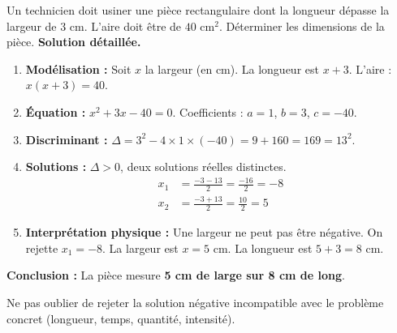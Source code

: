 \documentclass[11pt]{article}
\begin{document}
\begin{exoresolu}
    Un technicien doit usiner une pièce rectangulaire dont la longueur dépasse la largeur de $3$ cm. L'aire doit être de $40$ cm$^2$. Déterminer les dimensions de la pièce.
    \tcblower
    \textbf{Solution détaillée.}
    \begin{enumerate}
        \item \textbf{Modélisation :} Soit $x$ la largeur (en cm). La longueur est $x+3$. L'aire : $x(x+3) = 40$.
        \item \textbf{Équation :} $x^2 + 3x - 40 = 0$. Coefficients : $a=1$, $b=3$, $c=-40$.
        \item \textbf{Discriminant :} $\Delta = 3^2 - 4\times1\times(-40) = 9 + 160 = 169 = 13^2$.
        \item \textbf{Solutions :} $\Delta > 0$, deux solutions réelles distinctes.
        \begin{align*}
            x_1 &= \frac{-3 - 13}{2} = \frac{-16}{2} = -8 \\
            x_2 &= \frac{-3 + 13}{2} = \frac{10}{2} = 5
        \end{align*}
        \item \textbf{Interprétation physique :} Une largeur ne peut pas être négative. On rejette $x_1 = -8$.
        La largeur est $x = 5$ cm. La longueur est $5+3 = 8$ cm.
    \end{enumerate}
    \textbf{Conclusion :} La pièce mesure \textbf{5 cm de large sur 8 cm de long}.
    \begin{attention} Ne pas oublier de rejeter la solution négative incompatible avec le problème concret (longueur, temps, quantité, intensité).\end{attention}
\end{exoresolu}
\end{document}
